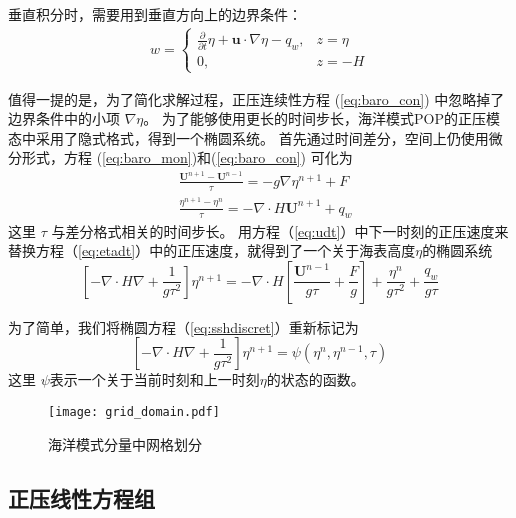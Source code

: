 垂直积分时，需要用到垂直方向上的边界条件：
\begin{align}
\label{eq:bound_w}
w = \left\{ \begin{array}{ll}
\frac{\partial}{\partial t} \eta  +\textbf{u}\cdot\nabla \eta - q_w, & z = \eta  \\
0, & z = -H
\end{array} \right.
\end{align}
 
值得一提的是，为了简化求解过程，正压连续性方程 (\ref{eq:baro_con}) 中忽略掉了边界条件中的小项 $\nabla \eta$\cite{smith2010parallel}。
为了能够使用更长的时间步长，海洋模式POP的正压模态中采用了隐式格式，得到一个椭圆系统。 
首先通过时间差分，空间上仍使用微分形式，方程  (\ref{eq:baro_mon})和(\ref{eq:baro_con}) 可化为
\begin{align}
&\displaystyle \frac{ \textbf{U}^{n+1} - \textbf{U}^{n-1}}{\tau}  = -g \nabla \eta^{n+1} + F \label{eq:udt} \\
&\displaystyle \frac{\eta^{n+1} - \eta^n }{\tau}  = - \nabla \cdot H\textbf{U} ^{n+1}+ q_w \label{eq:etadt}
\end{align}
这里 $\tau$ 与差分格式相关的时间步长。 
用方程（\ref{eq:udt}）中下一时刻的正压速度来替换方程（\ref{eq:etadt}）中的正压速度，就得到了一个关于海表高度$\eta$的椭圆系统
\begin{equation}
\label{eq:sshdiscret}
     [-\nabla\cdot H \nabla + \frac{1}{g  \tau^2}]\eta^{n+1}
           = -\nabla\cdot H[\frac{\textbf{U}^{n-1}}{g \tau} + \frac{F}{g}] + \frac{\eta^n}{g\tau^2} +\frac{q_w}{g\tau}
\end{equation}
 
为了简单，我们将椭圆方程（\ref{eq:sshdiscret}）重新标记为
\begin{equation}
\label{eq:ssh}
[-\nabla \cdot H\nabla +\frac{1}{g  \tau^2}]\eta^{n+1} = \psi(\eta^n,\eta^{n-1},\tau)
\end{equation}
这里 $\psi$表示一个关于当前时刻和上一时刻$\eta$的状态的函数。
 

\begin{figure}%
\centering
\texttt{[image: grid\_domain.pdf]}
\caption[] {海洋模式分量中网格划分\label{fig:grid1}}
\end{figure}


 

\subsection{正压线性方程组}
\label{solver:baroproperty}

